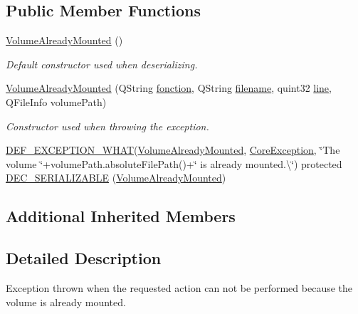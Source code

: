 \subsection*{Public Member Functions}
\begin{DoxyCompactItemize}
\item 
\hyperlink{class_gost_crypt_1_1_core_1_1_volume_already_mounted_aa4abffb4b0909452f7f4c8d01f4ee185}{Volume\+Already\+Mounted} ()
\begin{DoxyCompactList}\small\item\em Default constructor used when deserializing. \end{DoxyCompactList}\item 
\hyperlink{class_gost_crypt_1_1_core_1_1_volume_already_mounted_a9c7af1a71b35880d961e63f85402b61e}{Volume\+Already\+Mounted} (Q\+String \hyperlink{class_gost_crypt_1_1_gost_crypt_exception_a29b8c93d5efbb1ff369107385725a939}{fonction}, Q\+String \hyperlink{class_gost_crypt_1_1_gost_crypt_exception_a749a12375f4ba9d502623b99d8252f38}{filename}, quint32 \hyperlink{class_gost_crypt_1_1_gost_crypt_exception_abf506d911f12a4e969eea500f90bd32c}{line}, Q\+File\+Info volume\+Path)
\begin{DoxyCompactList}\small\item\em Constructor used when throwing the exception. \end{DoxyCompactList}\item 
\hyperlink{_gost_crypt_exception_8h_a5bc1e1c6c9d6f46c84eeba49e33355f9}{D\+E\+F\+\_\+\+E\+X\+C\+E\+P\+T\+I\+O\+N\+\_\+\+W\+H\+AT}(\hyperlink{class_gost_crypt_1_1_core_1_1_volume_already_mounted}{Volume\+Already\+Mounted}, \hyperlink{class_gost_crypt_1_1_core_1_1_core_exception}{Core\+Exception}, \char`\"{}The volume \char`\"{}+volume\+Path.\+absolute\+File\+Path()+\char`\"{} is already mounted.\textbackslash{}\char`\"{}) protected \hyperlink{class_gost_crypt_1_1_core_1_1_volume_already_mounted_acb246161982fc195d6245e86930d1be9}{D\+E\+C\+\_\+\+S\+E\+R\+I\+A\+L\+I\+Z\+A\+B\+LE} (\hyperlink{class_gost_crypt_1_1_core_1_1_volume_already_mounted}{Volume\+Already\+Mounted})
\end{DoxyCompactItemize}
\subsection*{Additional Inherited Members}


\subsection{Detailed Description}
Exception thrown when the requested action can not be performed because the volume is already mounted. 

